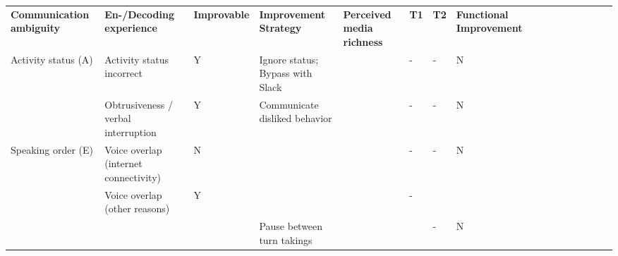 \documentclass[man]{apa7}
\begin{document}
\begin{landscape}

\begin{table}[]
\begin{tabular}{llllllllllllllll}
\cline{1-5}
\multicolumn{1}{|l|}{\textbf{Communication   ambiguity}} & \multicolumn{1}{l|}{\textbf{En-/Decoding experience}}      & \multicolumn{1}{l|}{\textbf{Improvable}} & \multicolumn{1}{l|}{\textbf{Improvement Strategy}}    & \multicolumn{1}{l|}{\textbf{Perceived media richness}} & \textbf{T1} & \textbf{T2} & \textbf{Functional Improvement} &  &  &  &  &  &  &  &  \\ \cline{1-5}
\multicolumn{1}{|l|}{Activity status (A)}                & \multicolumn{1}{l|}{Activity status incorrect}             & \multicolumn{1}{l|}{Y}                   & \multicolumn{1}{l|}{Ignore status; Bypass with Slack} & \multicolumn{1}{l|}{}                                  & -           & -           & N                               &  &  &  &  &  &  &  &  \\ \cline{1-5}
\multicolumn{1}{|l|}{}                                   & \multicolumn{1}{l|}{Obtrusiveness / verbal interruption}   & \multicolumn{1}{l|}{Y}                   & \multicolumn{1}{l|}{Communicate disliked behavior}    & \multicolumn{1}{l|}{}                                  & -           & -           & N                               &  &  &  &  &  &  &  &  \\ \cline{1-5}
\multicolumn{1}{|l|}{Speaking order (E)}                 & \multicolumn{1}{l|}{Voice overlap (internet connectivity)} & \multicolumn{1}{l|}{N}                   & \multicolumn{1}{l|}{}                                 & \multicolumn{1}{l|}{}                                  & -           & -           & N                               &  &  &  &  &  &  &  &  \\ \cline{1-5}
                                                         & Voice overlap (other reasons)                              & Y                                        &                                                       &                                                        & -           &             &                                 &  &  &  &  &  &  &  &  \\
                                                         &                                                            &                                          & Pause between turn takings                            &                                                        &             & -           & N                               &  &  &  &  &  &  &  &  \\

\end{tabular}
\end{table}
\end{landscape}
\end{document}
